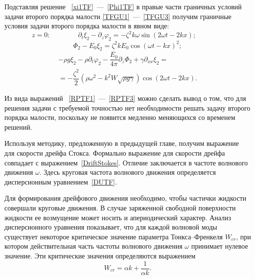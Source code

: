 Подставляя решение ~\eqref{xi1TF}~---~\eqref{Phi1TF} в правые части граничных условий задачи второго порядка малости \eqref{TFGU1}~---~\eqref{TFGU3} получим граничные условия задачи второго порядка малости в явном виде:
\begin{equation}
z=0: \qquad \qquad   \partial_{t} \xi_{2}-\partial_{z}\varphi_{2}=-\zeta^{2} k \omega \sin \left( 2 \omega t - 2 k x \right);\qquad \qquad  \label{RPTF1}
\end{equation}
\begin{equation}
\Phi_{2}-E_{0}\xi_{2}=\zeta^{2}k E_{0} \cos\left( \omega t - k x \right)^{2};\label{RPTF2}
\end{equation}
\begin{multline}
-\rho g \xi_{2} - \rho \partial_{t}\varphi_{2}-\dfrac{E_{0}}{4 \pi}\partial_{z}\Phi_{2}+\gamma \partial_{xx}\xi_{2}=\\
=-\dfrac{\zeta^{2}}{2}\left(\rho \omega^{2}-k^{2}W\sqrt{\rho g \gamma}\right) \cos \left( 2 \omega t - 2 k x \right).\label{RPTF3}
\end{multline}
	  	
Из вида выражений ~\eqref{RPTF1}~---~\eqref{RPTF3}   можно сделать вывод о том, что для решения задачи с требуемой точностью нет необходимости решать задачу второго порядка малости, поскольку не появится медленно меняющихся со временем решений.

Используя методику, предложенную в предыдущей главе, получим выражение для скорости дрейфа Стокса. Формально выражение для скорости дрейфа совпадает с выражением~\eqref{DriftStokes}. Отличие заключается в частоте волнового движения  $ \omega $. Здесь круговая частота волнового движения определяется дисперсионным уравнением~\eqref{DUTF}. 

Для формирования дрейфового движения необходимо, чтобы частички жидкости совершали круговые движения. В случае заряженной свободной поверхности жидкости ее возмущение может носить и апериодический характер. Анализ дисперсионного уравнения показывает, что для каждой волновой моды существует некоторое критическое значение параметра Тонкса--Френкеля  $ W_{cr} $, при котором действительная часть частоты волнового движения $ \omega $  принимает нулевое значение. Эти критические значения определяются выражением
\begin{equation}
W_{cr}=\alpha k +\dfrac{1}{\alpha k}.
\label{WCrit}
\end{equation}

